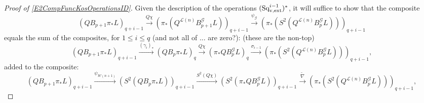 \documentclass[11pt]{amsart}
\theoremstyle{plain}
\theoremstyle{definition}
\renewcommand{\to}{\longrightarrow}
\newcommand{\scrG}{\mathscr{G}}
\newcommand{\calL}{\mathcal{L}}
\newcommand{\calw}{\mathcal{W}}
\theoremstyle{plain}
\newcommand{\BSW}{{\scrG}}
\newcommand{\BSWres}{B^\BSW}%
\newcommand{\vExtCohOp}{\textup{Sq}_\textup{v,ext}}
\begin{document}
\begin{Operations in composite functor spectral sequences}
\begin{proof}[Proof of \ref{E2CompFuncKosOperationsID}]
Given the description of the operations $(\vExtCohOp^{i-1})^*$, it will suffice to show that the composite
\[(QB_{p+1}\pi_*L)_{q+i-1}\overset{Q\chi}{\to}(\pi_*(Q^{\calL(n)}\BSWres_{p+1}L))_{q+i-1}\overset{\psi_{\BSW}}{\to}(\pi_*(S^2(Q^{\calL(n)}\BSWres_pL)))_{q+i-1}\]
equals the sum of the composites, for $1\leq i \leq q$ (and not all of ... are zero?): (these are the non-top)
\[(QB_{p+1}\pi_* L)_{q+i-1}\overset{(\gamma_i)_*}{\to} (QB_{p}\pi_* L)_q\overset{Q\chi}{\to} (\pi_*Q\BSWres_{p}L)_q\overset{\sigma_{i-1}}{\to} (\pi_*(S^2(Q^{\calL(n)}\BSWres_{p}L)))_{q+i-1},\]
added to the composite:
\[(QB_{p+1}\pi_* L)_{q+i-1}\overset{\psi_{\calw(n+1)}}{\to}(S^2(QB_{p}\pi_* L))_{q+i-1}\overset{S^2(Q\chi)}{\to}
(S^2(\pi_*Q\BSWres_pL))_{q+i-1}\overset{\widetilde{\nabla}}{\to}
(\pi_*(S^2(Q^{\calL(n)}\BSWres_{p}L)))_{q+i-1},\]



\end{proof}
\end{Operations in composite functor spectral sequences}
\end{document}
